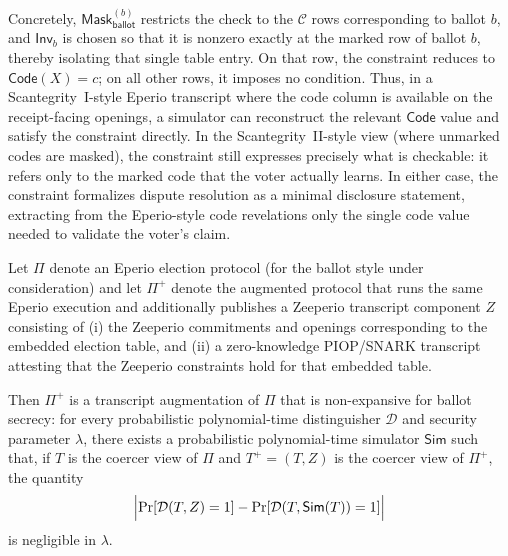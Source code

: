 Concretely, $\mathsf{Mask}^{(b)}_{\mathsf{ballot}}$ restricts the check to the $\mathcal{C}$ rows corresponding to ballot
$b$, and $\mathsf{Inv}_b$ is chosen so that it is nonzero exactly at the marked row of ballot $b$, thereby isolating that
single table entry. On that row, the constraint reduces to $\mathsf{Code}(X)=c$; on all other rows, it imposes no
condition. Thus, in a Scantegrity~I-style Eperio transcript where the code column is available on the receipt-facing
openings, a simulator can reconstruct the relevant $\mathsf{Code}$ value and satisfy the constraint directly. In the
Scantegrity~II-style view (where unmarked codes are masked), the constraint still expresses precisely what is checkable:
it refers only to the marked code that the voter actually learns. In either case, the constraint formalizes dispute
resolution as a minimal disclosure statement, extracting from the Eperio-style code revelations only the single code value
needed to validate the voter’s claim.

\begin{theorem}
Let $\Pi$ denote an Eperio election protocol (for the ballot style under consideration) and let $\Pi^{+}$ denote the
augmented protocol that runs the same Eperio execution and additionally publishes a Zeeperio transcript component $Z$
consisting of (i) the Zeeperio commitments and openings corresponding to the embedded election table, and (ii) a
zero-knowledge PIOP/SNARK transcript attesting that the Zeeperio constraints hold for that embedded table.

Then $\Pi^{+}$ is a transcript augmentation of $\Pi$ that is non-expansive for ballot secrecy: for every probabilistic
polynomial-time distinguisher $\mathcal{D}$ and security parameter $\lambda$, there exists a probabilistic
polynomial-time simulator $\mathsf{Sim}$ such that, if $T$ is the coercer view of $\Pi$ and $T^{+}=(T,Z)$ is the coercer
view of $\Pi^{+}$, the quantity
\[
\Bigl|\Pr[\mathcal{D}(T,Z)=1] - \Pr[\mathcal{D}(T,\mathsf{Sim}(T))=1]\Bigr|
\]
is negligible in $\lambda$.
\end{theorem}


